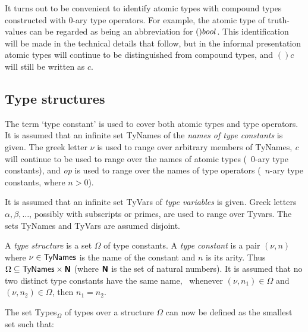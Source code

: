 It turns out to be convenient to identify atomic types with
compound types constructed with $0$-ary type operators.  For example,
the atomic type  of truth-values can be regarded as being an
abbreviation for $(){\sl bool}$.  This identification will be made in
the technical details that follow, but in the informal presentation
atomic types will continue to be distinguished from compound types,
and $()c$ will still be written as $c$.

\subsection{Type structures}
\label{type structures}

The term `type constant' is used to cover both atomic types and type
operators.  It is assumed that an infinite set {\sf
TyNames} of the {\em names of type constants\/} is given.  The greek
letter $\nu$ is used to range over arbitrary members of {\sf TyNames},
{\sl c} will continue to be used to range over the names of atomic
types (\ie\ $0$-ary type constants), and {\sl op} is used to range
over the names of type operators (\ie\ $n$-ary type constants, where
$n>0$).

It is assumed that an infinite set {\sf TyVars} of {\em type
variables\/}
 is given.  Greek letters $\alpha,\beta,\ldots$, possibly with
subscripts or primes, are used to range over {\sf Tyvars}.  The sets
{\sf TyNames} and {\sf TyVars} are assumed disjoint.

A {\it type structure\/} is a set $\Omega$ of type constants. A {\it
type constant\/} is a pair $(\nu,n)$ where $\nu\in{\sf TyNames}$ is the
name of the constant and $n$ is its arity.  Thus $\Omega\subseteq{\sf
TyNames}\times\mbox{${\sf N}\!\!\!\!{\sf N}$}$ (where $\mbox{${\sf N}\!\!\!\!{\sf N}$}$ is the set of natural
numbers).  It is assumed that no two distinct type constants have the
same name,
\ie\ whenever $(\nu, n_1)\in\Omega$ and
$(\nu, n_2)\in\Omega$, then $n_1 = n_2$.

The set {\sf Types}$_{\Omega}$ of types over a structure ${\Omega}$
can now be defined as the smallest set such that:

